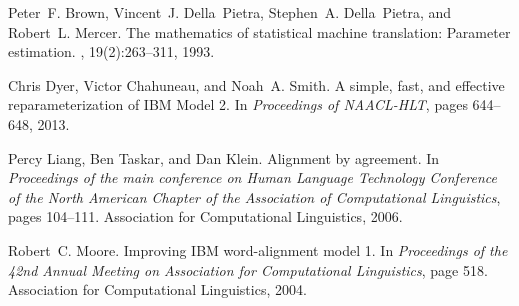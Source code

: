 \documentclass[11pt,twocolumn]{article}
\begin{document}
\begin{thebibliography}{1}

Peter~F. Brown, Vincent~J. Della~Pietra, Stephen~A. Della~Pietra, and Robert~L.
  Mercer.
\newblock The mathematics of statistical machine translation: Parameter
  estimation.
, 19(2):263--311, 1993.

Chris Dyer, Victor Chahuneau, and Noah~A. Smith.
\newblock A simple, fast, and effective reparameterization of {IBM Model 2}.
\newblock In {\em Proceedings of NAACL-HLT}, pages 644--648, 2013.

Percy Liang, Ben Taskar, and Dan Klein.
\newblock Alignment by agreement.
\newblock In {\em Proceedings of the main conference on Human Language
  Technology Conference of the North American Chapter of the Association of
  Computational Linguistics}, pages 104--111. Association for Computational
  Linguistics, 2006.

Robert~C. Moore.
\newblock Improving {IBM} word-alignment model 1.
\newblock In {\em Proceedings of the 42nd Annual Meeting on {Association for
  Computational Linguistics}}, page 518. Association for Computational
  Linguistics, 2004.

\end{thebibliography}
\end{document}
